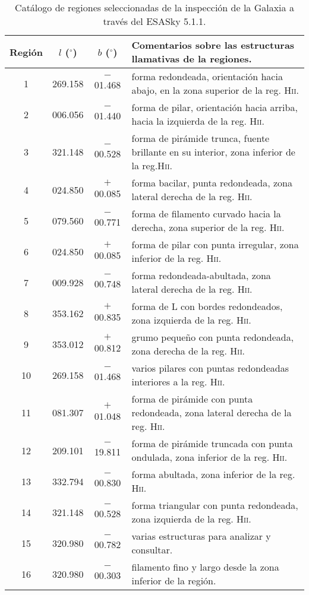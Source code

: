 \documentclass[baaa]{baaa}
\newcommand{\hii}{H\textsc{ii}}
\begin{document}
\begin{table*}
\centering
\caption{Catálogo de regiones seleccionadas de la inspección de la Galaxia a través del {\sc ESASky 5.1.1}.}
\label{tab}
\begin{tabular}{cccl}
\hline\hline
\noalign{\smallskip}
Región	&	$l$ ($^\circ$) &	$b$  ($^\circ$) & Comentarios sobre las estructuras llamativas de la regiones.\\ 
\hline 
1 & 269.158 & $-$01.468 & forma redondeada, orientación hacia abajo, en la zona superior de la reg. \hii. \\ 
2 &	006.056   & $-$01.440 & forma de pilar, orientación hacia arriba, hacia la izquierda de la reg. \hii.\\ 
3 &	321.148 & $-$00.528 & forma de pirámide trunca, fuente brillante en su interior, zona inferior de la reg.\hii.\\ 
4 &	024.850  &  $+$00.085 & forma bacilar, punta redondeada, zona lateral derecha de la reg. \hii. \\ 
5 & 079.560  & $-$00.771 & forma de filamento curvado hacia la derecha, zona superior de la reg. \hii.\\ 
6 & 024.850	& $+$00.085  & forma de pilar con punta irregular, zona inferior de la reg. \hii.\\
7 & 009.928 & $-$00.748 &	forma redondeada-abultada, zona lateral derecha de la reg. \hii.\\
8 & 353.162 & $+$00.835 &	forma de L con bordes redondeados, zona izquierda de la reg. \hii.\\
9 &	353.012 & $+$00.812 &	grumo pequeño con punta redondeada, zona derecha de la reg. \hii.\\
10 & 269.158 & $-$01.468	& varios pilares con puntas redondeadas interiores a la reg. \hii.\\
11 & 081.307 & $+$01.048	& forma de pirámide con punta redondeada, zona lateral derecha de la reg. \hii.\\
12 & 209.101 & $-$19.811	& forma de pirámide truncada con punta ondulada, zona inferior de la reg. \hii.\\
13 & 332.794 & $-$00.830	& forma abultada, zona inferior de la reg. \hii.\\
14	& 321.148	& $-$00.528 &	forma triangular con punta redondeada, zona izquierda de la reg. \hii.\\
15	& 320.980	& $-$00.782 & varias estructuras para analizar y consultar.\\
16	& 320.980	& $-$00.303 &	filamento fino y largo desde la zona inferior de la región.\\

\end{tabular}
\end{table*}
\end{document}
